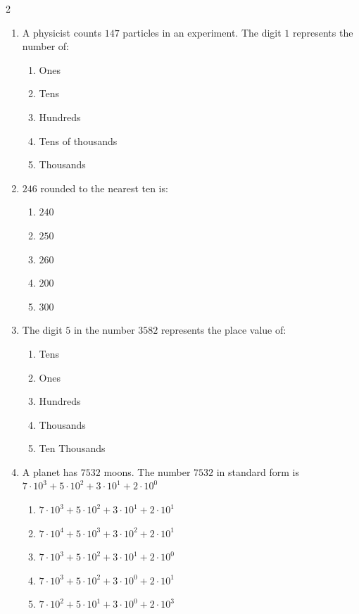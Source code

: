 \documentclass[10pt]{article}
\begin{document}
\begin{multicols}{2}
\begin{enumerate}[label=\textbf{Q\arabic*.}, leftmargin=*, itemsep=6pt, parsep=0pt]
  \item \small A physicist counts $147$ particles in an experiment. The digit $1$ represents the number of:
  \begin{enumerate}[label=(\Alph*), leftmargin=0.6cm, nosep, itemsep=2pt]
    \item Ones
    \item Tens
    \item Hundreds
    \item Tens of thousands
    \item Thousands
  \end{enumerate}

  \item \small $246$ rounded to the nearest ten is:
  \begin{enumerate}[label=(\Alph*), leftmargin=0.6cm, nosep, itemsep=2pt]
    \item $240$
    \item $250$
    \item $260$
    \item $200$
    \item $300$
  \end{enumerate}

  \item \small The digit $5$ in the number $3582$ represents the place value of:
  \begin{enumerate}[label=(\Alph*), leftmargin=0.6cm, nosep, itemsep=2pt]
    \item Tens
    \item Ones
    \item Hundreds
    \item Thousands
    \item Ten Thousands
  \end{enumerate}

  \item \small A planet has $7532$ moons. The number $7532$ in standard form is $7 \cdot 10^3 + 5 \cdot 10^2 + 3 \cdot 10^1 + 2 \cdot 10^0$
  \begin{enumerate}[label=(\Alph*), leftmargin=0.6cm, nosep, itemsep=2pt]
    \item $7 \cdot 10^3 + 5 \cdot 10^2 + 3 \cdot 10^1 + 2 \cdot 10^1$
    \item $7 \cdot 10^4 + 5 \cdot 10^3 + 3 \cdot 10^2 + 2 \cdot 10^1$
    \item $7 \cdot 10^3 + 5 \cdot 10^2 + 3 \cdot 10^1 + 2 \cdot 10^0$
    \item $7 \cdot 10^3 + 5 \cdot 10^2 + 3 \cdot 10^0 + 2 \cdot 10^1$
    \item $7 \cdot 10^2 + 5 \cdot 10^1 + 3 \cdot 10^0 + 2 \cdot 10^3$
  \end{enumerate}


\end{enumerate}
\end{multicols}
\end{document}
